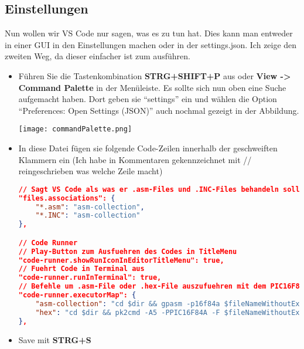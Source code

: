 \subsection{Einstellungen}
Nun wollen wir VS Code nur sagen, was es zu tun hat. Dies kann man entweder in einer GUI in den Einstellungen machen oder in der {\ttfamily settings.json}. Ich zeige den zweiten Weg, da dieser einfacher ist zum ausführen.
\begin{itemize}
    \item[1)] Führen Sie die Tastenkombination \textbf{STRG+SHIFT+P} aus oder \textbf{View -> Command Palette} in der Menüleiste. Es sollte sich nun oben eine Suche aufgemacht haben. Dort geben sie \enquote{settings} ein und wählen die Option \enquote{Preferences: Open Settings (JSON)} auch nochmal gezeigt in der Abbildung.
    \begin{center}
        \texttt{[image: commandPalette.png]}
    \end{center}
    \item[2)] In diese Datei fügen sie folgende Code-Zeilen innerhalb der geschweiften Klammern ein (Ich habe in Kommentaren gekennzeichnet mit // reingeschrieben was welche Zeile macht)
\begin{lstlisting}[language=json]
// Sagt VS Code als was er .asm-Files und .INC-Files behandeln soll
"files.associations": {
    "*.asm": "asm-collection",
    "*.INC": "asm-collection"
},

// Code Runner
// Play-Button zum Ausfuehren des Codes in TitleMenu
"code-runner.showRunIconInEditorTitleMenu": true,
// Fuehrt Code in Terminal aus
"code-runner.runInTerminal": true,
// Befehle um .asm-File oder .hex-File auszufuehren mit dem PIC16F84A als Standard PIC
"code-runner.executorMap": {
    "asm-collection": "cd $dir && gpasm -p16f84a $fileNameWithoutExt.asm &&  pk2cmd -A5 -PPIC16F84A -F $fileNameWithoutExt.hex -M -T -R && cd $workspaceRoot",
    "hex": "cd $dir && pk2cmd -A5 -PPIC16F84A -F $fileNameWithoutExt.hex -M -T -R"
},
\end{lstlisting}
    \item[3)] Save mit \textbf{STRG+S}
\end{itemize}

